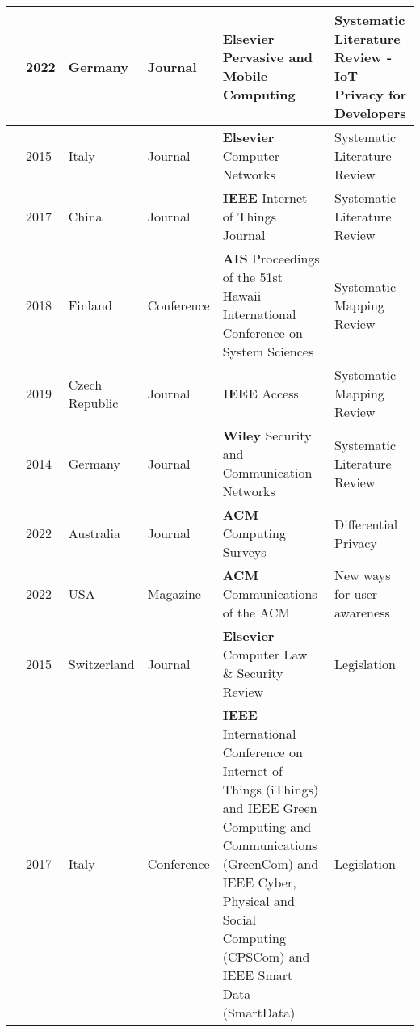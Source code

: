 \begin{footnotesize}
\begin{longtable}{p{1.2cm} p{1cm} p{1.5cm} p{3.2cm} p{5cm} p{3cm}}
        \hline
        \cite{Kuhtreiber2022survey} & 2022 & Germany & Journal & \textbf{Elsevier} Pervasive and Mobile Computing & Systematic Literature Review - IoT Privacy for Developers \\
        \hline
        \cite{sicari2015security} & 2015 & Italy & Journal & \textbf{Elsevier} Computer Networks & Systematic Literature Review \\
        \hline
        \cite{LinSurvey} & 2017 & China & Journal & \textbf{IEEE} Internet of Things Journal & Systematic Literature Review \\
        \hline
        \cite{porras2018security} & 2018 & Finland & Conference & \textbf{AIS} Proceedings of the 51st Hawaii International Conference on System Sciences & Systematic Mapping Review \\
        \hline
        \cite{ahmed2019aspects} & 2019 & Czech Republic & Journal & \textbf{IEEE} Access & Systematic Mapping Review \\
        \hline
        \cite{ziegeldorf2014privacy} & 2014 & Germany & Journal & \textbf{Wiley} Security and Communication Networks & Systematic Literature Review \\
        \hline
        \cite{ZhaoSurvey} & 2022 & Australia & Journal & \textbf{ACM} Computing Surveys & Differential Privacy \\
        \hline
        \cite{SkirpanPrivacy} & 2022 & USA & Magazine & \textbf{ACM} Communications of the ACM & New ways for user awareness \\
        \hline
        \cite{WEBER2015618} & 2015 & Switzerland & Journal & \textbf{Elsevier} Computer Law \& Security Review & Legislation \\
        \hline
        \cite{FabianoInternet} & 2017 & Italy & Conference & \textbf{IEEE} International Conference on Internet of Things (iThings) and IEEE Green Computing and Communications (GreenCom) and IEEE Cyber, Physical and Social Computing (CPSCom) and IEEE Smart Data (SmartData) & Legislation \\

\end{longtable}
\end{footnotesize}
